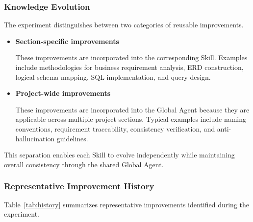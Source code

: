 \subsubsection{Knowledge Evolution}

The experiment distinguishes between two categories of reusable improvements.

\begin{itemize}

\item \textbf{Section-specific improvements}

These improvements are incorporated into the corresponding Skill. Examples include methodologies for business requirement analysis, ERD construction, logical schema mapping, SQL implementation, and query design.

\item \textbf{Project-wide improvements}

These improvements are incorporated into the Global Agent because they are applicable across multiple project sections. Typical examples include naming conventions, requirement traceability, consistency verification, and anti-hallucination guidelines.

\end{itemize}

This separation enables each Skill to evolve independently while maintaining overall consistency through the shared Global Agent.

\subsubsection{Representative Improvement History}

Table~\ref{tab:history} summarizes representative improvements identified during the experiment.

